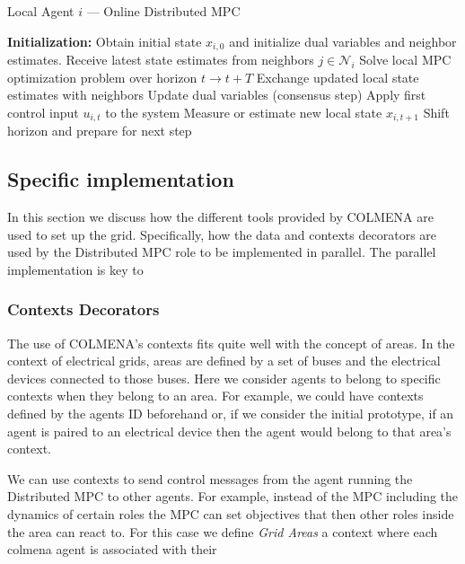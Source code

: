 \documentclass{article}
\begin{document}
\begin{algorithm}[H]
\caption{Local Agent $i$ — Online Distributed MPC}
\begin{algorithmic}[1]
\State \textbf{Initialization:} Obtain initial state $x_{i,0}$ and initialize dual variables and neighbor estimates.
        \State Receive latest state estimates from neighbors $j \in \mathcal{N}_i$
        \State Solve local MPC optimization problem over horizon $t \rightarrow t+T$
        \State Exchange updated local state estimates with neighbors
        \State Update dual variables (consensus step)
    \EndWhile
    \State Apply first control input $u_{i,t}$ to the system
    \State Measure or estimate new local state $x_{i,t+1}$
    \State Shift horizon and prepare for next step
\EndWhile
\end{algorithmic}
\end{algorithm}

\subsection{Specific implementation}

In this section we discuss how the different tools provided by COLMENA are used to set up the grid. Specifically, how the data and contexts decorators are used by the Distributed MPC role to be implemented in parallel. The parallel implementation is key to 

\subsubsection*{Contexts Decorators}

The use of COLMENA's contexts fits quite well with the concept of areas. In the context of electrical grids, areas are defined  by a set of buses and the electrical devices connected to those buses. Here we consider agents to belong to specific contexts when they belong to an area. For example, we could have contexts defined by the agents ID beforehand or, if we consider the initial prototype, if an agent is paired to an electrical device then the agent would belong to that area's context.

We can use contexts to send control messages from the agent running the Distributed MPC to other agents. For example, instead of the MPC including the dynamics of certain roles the MPC can set objectives that then other roles inside the area can react to. For this case we define \textit{Grid Areas} a context where each colmena agent is associated with their 
\end{document}
